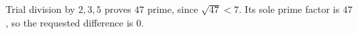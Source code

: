 Trial division by $2,3,5$ proves $47$ prime, since $\sqrt{47}<7$. Its sole prime factor is $47$, so the requested difference is $\boxed0$.
